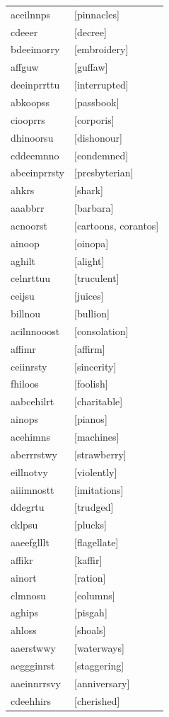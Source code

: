 \documentclass{article}
\begin{document}
\begin{tabular}{ll}
aceilnnps & [pinnacles] \\
cdeeer & [decree] \\
bdeeimorry & [embroidery] \\
affguw & [guffaw] \\
deeinprrttu & [interrupted] \\
abkoopss & [passbook] \\
ciooprrs & [corporis] \\
dhinoorsu & [dishonour] \\
cddeemnno & [condemned] \\
abeeinprrsty & [presbyterian] \\
ahkrs & [shark] \\
aaabbrr & [barbara] \\
acnoorst & [cartoons, corantos] \\
ainoop & [oinopa] \\
aghilt & [alight] \\
celnrttuu & [truculent] \\
ceijsu & [juices] \\
billnou & [bullion] \\
acilnnooost & [consolation] \\
affimr & [affirm] \\
ceiinrsty & [sincerity] \\
fhiloos & [foolish] \\
aabcehilrt & [charitable] \\
ainops & [pianos] \\
acehimns & [machines] \\
aberrrstwy & [strawberry] \\
eillnotvy & [violently] \\
aiiimnostt & [imitations] \\
ddegrtu & [trudged] \\
cklpsu & [plucks] \\
aaeefglllt & [flagellate] \\
affikr & [kaffir] \\
ainort & [ration] \\
clmnosu & [columns] \\
aghips & [pisgah] \\
ahloss & [shoals] \\
aaerstwwy & [waterways] \\
aeggginrst & [staggering] \\
aaeinnrrsvy & [anniversary] \\
cdeehhirs & [cherished] \\

\end{tabular}
\end{document}
